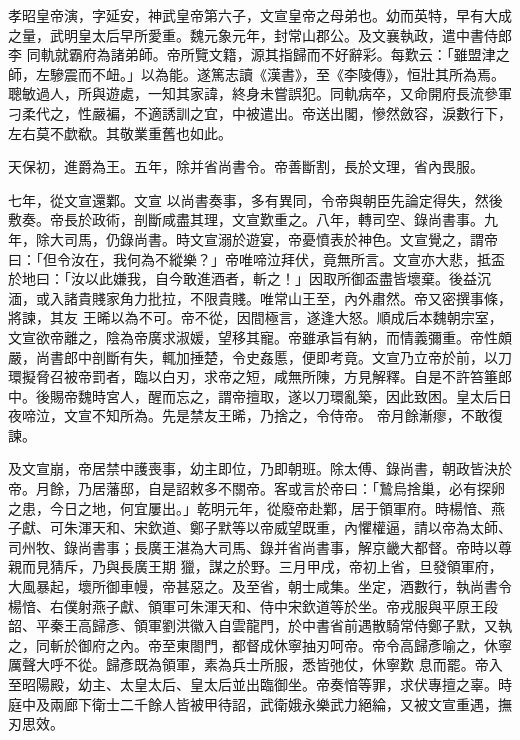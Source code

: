 
\begin{pinyinscope}

 孝昭皇帝演，字延安，神武皇帝第六子，文宣皇帝之母弟也。幼而英特，早有大成之量，武明皇太后早所愛重。魏元象元年，封常山郡公。及文襄執政，遣中書侍郎李
 同軌就霸府為諸弟師。帝所覽文籍，源其指歸而不好辭彩。每歎云：「雖盟津之師，左驂震而不衄。」以為能。遂篤志讀《漢書》，至《李陵傳》，恒壯其所為焉。聰敏過人，所與遊處，一知其家諱，終身未嘗誤犯。同軌病卒，又命開府長流參軍刁柔代之，性嚴褊，不適誘訓之宜，中被遣出。帝送出閣，慘然斂容，淚數行下，左右莫不歔欷。其敬業重舊也如此。



 天保初，進爵為王。五年，除并省尚書令。帝善斷割，長於文理，省內畏服。



 七年，從文宣還鄴。文宣
 以尚書奏事，多有異同，令帝與朝臣先論定得失，然後敷奏。帝長於政術，剖斷咸盡其理，文宣歎重之。八年，轉司空、錄尚書事。九年，除大司馬，仍錄尚書。時文宣溺於遊宴，帝憂憤表於神色。文宣覺之，謂帝曰：「但令汝在，我何為不縱樂？」帝唯啼泣拜伏，竟無所言。文宣亦大悲，抵盃於地曰：「汝以此嫌我，自今敢進酒者，斬之！」因取所御盃盡皆壞棄。後益沉湎，或入諸貴賤家角力批拉，不限貴賤。唯常山王至，內外肅然。帝又密撰事條，將諫，其友
 王晞以為不可。帝不從，因間極言，遂逢大怒。順成后本魏朝宗室，文宣欲帝離之，陰為帝廣求淑媛，望移其寵。帝雖承旨有納，而情義彌重。帝性頗嚴，尚書郎中剖斷有失，輒加捶楚，令史姦慝，便即考竟。文宣乃立帝於前，以刀環擬脅召被帝罰者，臨以白刃，求帝之短，咸無所陳，方見解釋。自是不許笞箠郎中。後賜帝魏時宮人，醒而忘之，謂帝擅取，遂以刀環亂築，因此致困。皇太后日夜啼泣，文宣不知所為。先是禁友王晞，乃捨之，令侍帝。
 帝月餘漸瘳，不敢復諫。



 及文宣崩，帝居禁中護喪事，幼主即位，乃即朝班。除太傅、錄尚書，朝政皆決於帝。月餘，乃居藩邸，自是詔敕多不關帝。客或言於帝曰：「鷙烏捨巢，必有探卵之患，今日之地，何宜屢出。」乾明元年，從廢帝赴鄴，居于領軍府。時楊愔、燕子獻、可朱渾天和、宋欽道、鄭子默等以帝威望既重，內懼權逼，請以帝為太師、司州牧、錄尚書事；長廣王湛為大司馬、錄并省尚書事，解京畿大都督。帝時以尊親而見猜斥，乃與長廣王期
 獵，謀之於野。三月甲戌，帝初上省，旦發領軍府，大風暴起，壞所御車幔，帝甚惡之。及至省，朝士咸集。坐定，酒數行，執尚書令楊愔、右僕射燕子獻、領軍可朱渾天和、侍中宋欽道等於坐。帝戎服與平原王段韶、平秦王高歸彥、領軍劉洪徽入自雲龍門，於中書省前遇散騎常侍鄭子默，又執之，同斬於御府之內。帝至東閤門，都督成休寧抽刃呵帝。帝令高歸彥喻之，休寧厲聲大呼不從。歸彥既為領軍，素為兵士所服，悉皆弛仗，休寧歎
 息而罷。帝入至昭陽殿，幼主、太皇太后、皇太后並出臨御坐。帝奏愔等罪，求伏專擅之辜。時庭中及兩廊下衛士二千餘人皆被甲待詔，武衛娥永樂武力絕綸，又被文宣重遇，撫刃思效。




\end{pinyinscope}
